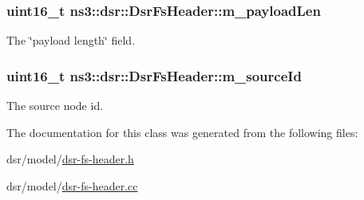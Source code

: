 \subsubsection[{\texorpdfstring{m\+\_\+payload\+Len}{m_payloadLen}}]{\setlength{\rightskip}{0pt plus 5cm}uint16\+\_\+t ns3\+::dsr\+::\+Dsr\+Fs\+Header\+::m\+\_\+payload\+Len\hspace{0.3cm}{\ttfamily [private]}}\hypertarget{classns3_1_1dsr_1_1DsrFsHeader_a9dc07aa5b9440cc15d2b99b5f6c57037}{}\label{classns3_1_1dsr_1_1DsrFsHeader_a9dc07aa5b9440cc15d2b99b5f6c57037}


The \char`\"{}payload length\char`\"{} field. 

\subsubsection[{\texorpdfstring{m\+\_\+source\+Id}{m_sourceId}}]{\setlength{\rightskip}{0pt plus 5cm}uint16\+\_\+t ns3\+::dsr\+::\+Dsr\+Fs\+Header\+::m\+\_\+source\+Id\hspace{0.3cm}{\ttfamily [private]}}\hypertarget{classns3_1_1dsr_1_1DsrFsHeader_a6906146cac69c891c9c54a722dc8b36a}{}\label{classns3_1_1dsr_1_1DsrFsHeader_a6906146cac69c891c9c54a722dc8b36a}


The source node id. 



The documentation for this class was generated from the following files\+:\begin{DoxyCompactItemize}
\item 
dsr/model/\hyperlink{dsr-fs-header_8h}{dsr-\/fs-\/header.\+h}\item 
dsr/model/\hyperlink{dsr-fs-header_8cc}{dsr-\/fs-\/header.\+cc}\end{DoxyCompactItemize}
